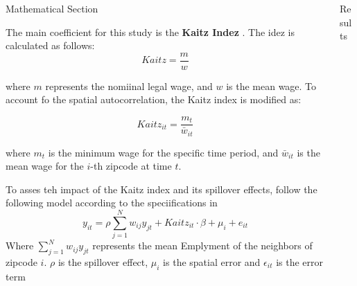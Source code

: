 \documentclass[final]{beamer}
\newlength{\onecolwid}
\newlength{\twocolwid}
\begin{document}
\begin{frame}[t]
\begin{columns}[t]
\begin{column}{\twocolwid}
\begin{columns}[t,totalwidth=\twocolwid]
\begin{column}{\onecolwid}
					\begin{block}{Mathematical Section}

						The main coefficient for this study is the \textbf{Kaitz Indez} \cite{baker1994demography}. The idez is calculated as follows:
						\begin{equation}
							Kaitz = \frac{m}{w}
						\end{equation}

						where $m$ represents the nomiinal legal wage, and $w$ is the mean wage. To account fo the spatial autocorrelation, the Kaitz index is modified as:

						\begin{equation}
							Kaitz_{it} = \frac{m_t}{\bar{w}_{it}}
						\end{equation}

						where $m_t$ is the minimum wage for the specific time period, and $\bar{w}_{it}$ is the mean wage for the $i$-th zipcode at time $t$.

						To asses teh impact of the Kaitz index and its spillover effects, follow the following model according to the speciifications in \cite{elhorst2003specification}
						\begin{equation}
							y_{it} = \rho \sum_{j=1}^N w_{ij} y_{jt}  +  Kaitz_{it} \cdot \beta  +  \mu_i  +  e_{it}
						\end{equation}
						Where $\sum_{j=1}^N w_{ij} y_{jt}$ represents the mean Emplyment of the neighbors of zipcode $i$. $\rho$ is the spillover effect, $\mu_i$ is the spatial error and $\epsilon_{it}$ is the error term
					\end{block}


				\end{column} %

				\begin{column}{\onecolwid} %


					\begin{block}{Results}


\end{block}
\end{column}
\end{columns}
\end{column}
\end{columns}
\end{frame}
\end{document}
